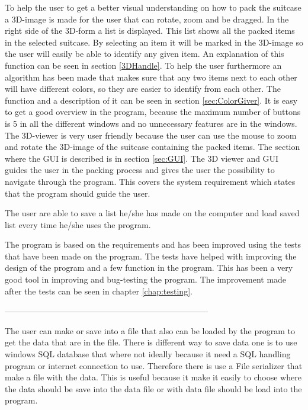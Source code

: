 To help the user to get a better visual understanding on how to pack the suitcase a 3D-image is made for the user that can rotate, zoom and be dragged. In the right side of the 3D-form a list is displayed. This list shows all the packed items in the selected suitcase. By selecting an item it will be marked in the 3D-image so the user will easily be able to identify any given item. An explanation of this function can be seen in section \ref{3DHandle}. To help the user furthermore an algorithm has been made that makes sure that any two items next to each other will have different colors, so they are easier to identify from each other. The function and a description of it can be seen in section \ref{sec:ColorGiver}.
It is easy to get a good overview in the program, because the maximum number of buttons is 5 in all the different windows and no unnecessary features are in the windows. The 3D-viewer is very user friendly because the user can use the mouse to zoom and rotate the 3D-image of the suitcase containing the packed items. The section where the GUI is described is in section \ref{sec:GUI}.
The 3D viewer and GUI guides the user in the packing process and gives the user the possibility to navigate through the program. This covers the system requirement which states that the program should guide the user.

The user are able to save a list he/she has made on the computer and load saved list every time he/she uses the program.

The program is based on the requirements and has been improved using the tests that have been made on the program. The tests have helped with improving the design of the program and a few function in the program. This has been a very good tool in improving and bug-testing the program. The improvement made after the tests can be seen in chapter \ref{chap:testing}.

-------------------------------------------------------------------------- 

The user can make or save into a file that also can be loaded by the program to get the data that are in the file. There is different way to save data one is to use windows SQL database that where not ideally because it need a SQL handling program or internet connection to use. Therefore there is use a File serializer that make a file with the data. This is useful because it make it easily to choose where the data should be save into the data file or with data file should be load into the program.